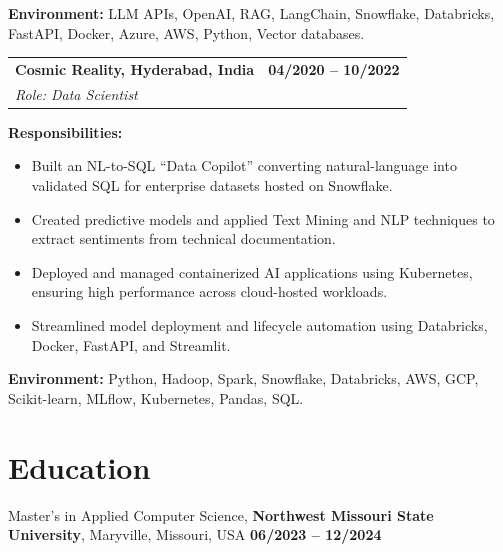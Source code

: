 \documentclass[11pt,letterpaper]{article}
\begin{document}
\textbf{Environment:} LLM APIs, OpenAI, RAG, LangChain, Snowflake, Databricks, FastAPI, Docker, Azure, AWS, Python, Vector databases.

\vspace{0pt}

\noindent
\begin{tabularx}{\linewidth}{@{}X r@{}}
  \textbf{Cosmic Reality, Hyderabad, India} & \textbf{04/2020 -- 10/2022}\\
  \textit{Role: Data Scientist} &
\end{tabularx}

\textbf{Responsibilities:}
\begin{itemize}
  \item Built an NL-to-SQL ``Data Copilot'' converting natural-language into validated SQL for enterprise datasets hosted on Snowflake.
  \item Created predictive models and applied Text Mining and NLP techniques to extract sentiments from technical documentation.
  \item Deployed and managed containerized AI applications using Kubernetes, ensuring high performance across cloud-hosted workloads.
  \item Streamlined model deployment and lifecycle automation using Databricks, Docker, FastAPI, and Streamlit.
\end{itemize}

\textbf{Environment:} Python, Hadoop, Spark, Snowflake, Databricks, AWS, GCP, Scikit-learn, MLflow, Kubernetes, Pandas, SQL.

\vspace{-8pt}
\section*{Education}
\vspace{-6pt}
\noindent Master's in Applied Computer Science, \textbf{Northwest Missouri State University},
Maryville, Missouri, USA \hfill \textbf{06/2023 -- 12/2024}
\end{document}
